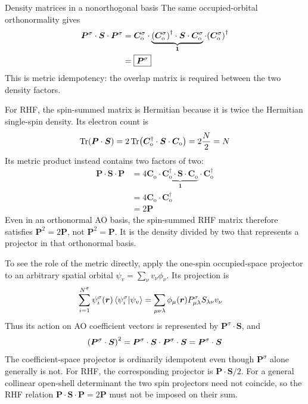 \documentclass[11pt,a4paper,titlepage]{article}
\numberwithin{equation}{section}
\newcommand{\br}{\boldsymbol{r}}
\newcommand{\bC}{\boldsymbol{C}}
\newcommand{\bI}{\boldsymbol{1}}
\newcommand{\bP}{\boldsymbol{P}}
\newcommand{\bS}{\boldsymbol{S}}
\begin{document}
\begin{hfsolution}{Density matrices in a nonorthogonal basis}
The same occupied-orbital orthonormality gives
\begin{equation}
\begin{split}
  \bP^\sigma\cdot\bS\cdot\bP^\sigma
  &=\bC_\text{o}^\sigma\cdot
    \underbrace{\qty(\bC_\text{o}^\sigma)^\dag\cdot\bS
      \cdot\bC_\text{o}^\sigma}_{\bI}
    \cdot\qty(\bC_\text{o}^\sigma)^\dag\\
  &=\boxed{\bP^\sigma}
\end{split}
\end{equation}
This is metric idempotency: the overlap matrix is required between the two
density factors.

For RHF, the spin-summed matrix is Hermitian because it is twice the
Hermitian single-spin density. Its electron count is
\begin{equation}
  \Tr(\bP\cdot\bS)
  =2\Tr(\bC_\text{o}^\dag\cdot\bS\cdot\bC_\text{o})
  =2\frac{N}{2}=N
\end{equation}
Its metric product instead contains two factors of two:
\begin{equation}
\begin{split}
  \bP\cdot\bS\cdot\bP
  &=4\bC_\text{o}\cdot
    \underbrace{\bC_\text{o}^\dag\cdot\bS\cdot\bC_\text{o}}_{\bI}
    \cdot\bC_\text{o}^\dag\\
  &=4\bC_\text{o}\cdot\bC_\text{o}^\dag\\
  &=\boxed{2\bP}
\end{split}
\end{equation}
Even in an orthonormal AO basis, the spin-summed RHF matrix therefore
satisfies $\bP^2=2\bP$, not $\bP^2=\bP$. It is the density divided by two
that represents a projector in that orthonormal basis.

To see the role of the metric directly, apply the one-spin occupied-space
projector to an arbitrary spatial orbital
$\psi_v=\sum_\nu v_\nu\phi_\nu$. Its projection is
\begin{equation}
\begin{split}
  \sum_{i=1}^{N^\sigma}\psi_i^\sigma(\br)
    \braket{\psi_i^\sigma}{\psi_v}
  &=\sum_{\mu\nu\lambda}\phi_\mu(\br)
    P_{\mu\lambda}^\sigma S_{\lambda\nu}v_\nu
\end{split}
\end{equation}
Thus its action on AO coefficient vectors is represented by
$\bP^\sigma\cdot\bS$, and
\begin{equation}
  \qty(\bP^\sigma\cdot\bS)^2
  =\bP^\sigma\cdot\bS\cdot\bP^\sigma\cdot\bS
  =\bP^\sigma\cdot\bS
\end{equation}
The coefficient-space projector is ordinarily idempotent even though
$\bP^\sigma$ alone generally is not. For RHF, the corresponding projector
is $\bP\cdot\bS/2$. For a general collinear open-shell determinant the
two spin projectors need not coincide, so the RHF relation
$\bP\cdot\bS\cdot\bP=2\bP$ must not be imposed on their sum.
\end{hfsolution}
\end{document}
